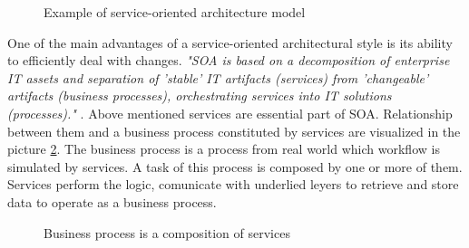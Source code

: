 \begin{figure}[htp] 
\caption{Example of service-oriented architecture model}
\label{fig:soa-architecture}
\end{figure}  

One of the main advantages of a service-oriented architectural style is its ability to efficiently deal with changes. \textit{"SOA is based on a decomposition of enterprise IT assets and separation of 'stable' IT artifacts (services) from 'changeable' artifacts (business processes), orchestrating services into IT solutions (processes)."} \cite{website:versioning-in-soa}. %
Above mentioned services are essential part of SOA. Relationship between them and a business process constituted by services are visualized in the picture \ref{fig:business-process-services}. The business process is a process from real world which workflow is simulated by services. A task of this process is composed by one or more of them. Services perform the logic, comunicate with underlied leyers to retrieve and store data to operate as a business process.

\begin{figure}[htp] 
\caption{Business process is a composition of services}
\label{fig:business-process-services}
\end{figure} 

